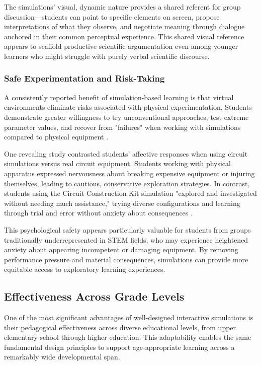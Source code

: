 The simulations' visual, dynamic nature provides a shared referent for group discussion---students can point to specific elements on screen, propose interpretations of what they observe, and negotiate meaning through dialogue anchored in their common perceptual experience. This shared visual reference appears to scaffold productive scientific argumentation even among younger learners who might struggle with purely verbal scientific discourse.

\subsubsection{Safe Experimentation and Risk-Taking}

A consistently reported benefit of simulation-based learning is that virtual environments eliminate risks associated with physical experimentation. Students demonstrate greater willingness to try unconventional approaches, test extreme parameter values, and recover from "failures" when working with simulations compared to physical equipment \cite{phet2023}.

One revealing study contrasted students' affective responses when using circuit simulations versus real circuit equipment. Students working with physical apparatus expressed nervousness about breaking expensive equipment or injuring themselves, leading to cautious, conservative exploration strategies. In contrast, students using the Circuit Construction Kit simulation "explored and investigated without needing much assistance," trying diverse configurations and learning through trial and error without anxiety about consequences \cite{finkelstein2005phet}.

This psychological safety appears particularly valuable for students from groups traditionally underrepresented in STEM fields, who may experience heightened anxiety about appearing incompetent or damaging equipment. By removing performance pressure and material consequences, simulations can provide more equitable access to exploratory learning experiences.

\subsection{Effectiveness Across Grade Levels}

One of the most significant advantages of well-designed interactive simulations is their pedagogical effectiveness across diverse educational levels, from upper elementary school through higher education. This adaptability enables the same fundamental design principles to support age-appropriate learning across a remarkably wide developmental span.

